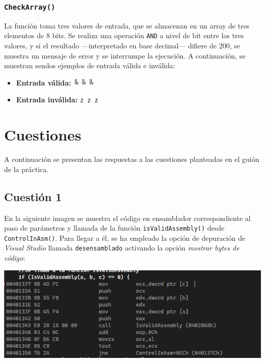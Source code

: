 \documentclass[11pt,a4paper]{article}
\begin{document}
\subsubsection{\texttt{CheckArray()}}
La función toma tres valores de entrada, que se almacenan en un array de tres elementos de 8 bits. Se realiza una operación \texttt{AND} a nivel de bit entre los tres valores, y si el resultado —interpretado en base decimal— difiere de 200, se muestra un mensaje de error y se interrumpe la ejecución. A continuación, se muestran sendos ejemplos de entrada válida e inválida:
\begin{itemize}
  \item \textbf{Entrada válida:}  {\myfont ╚ ╚ ╚}
  \item \textbf{Entrada inválida:} \texttt{z z z}
\end{itemize}

\vspace{3ex}

\section{Cuestiones}
A continuación se presentan las respuestas a las cuestiones planteadas en el guión de la práctica. \vspace{2ex}

\subsection{Cuestión 1}
En la siguiente imagen se muestra el código en ensamblador correspondiente al paso de parámetros y llamada de la función \texttt{isValidAssembly()} desde \texttt{ControlInAsm()}. Para llegar a él, se ha empleado la opción de depuración de \textit{Visual Studio} llamada \texttt{desensamblado} activando la opción \textit{mostrar bytes de código}:\vspace{2ex}
\begin{center}
  \includegraphics[width=1\textwidth]{pasoParametrosCodigo.png}
\end{center}
\vspace{3ex}
\end{document}
